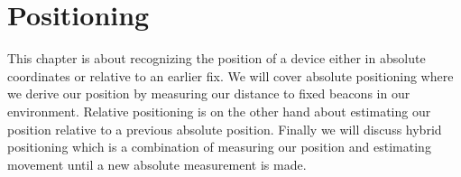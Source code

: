 \chapter{Positioning} \label{ch:positioning}

This chapter is about recognizing the position of a device either in absolute coordinates or relative to an earlier fix. We will cover absolute positioning where we derive our position by measuring our distance to fixed beacons in our environment. Relative positioning is on the other hand about estimating our position relative to a previous absolute position. Finally we will discuss hybrid positioning which is a combination of measuring our position and estimating movement until a new absolute measurement is made.




